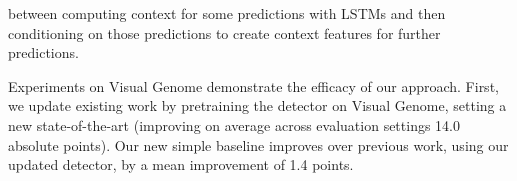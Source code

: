 \documentclass[10pt,twocolumn,letterpaper]{article}
\begin{document}
between computing context for some predictions with LSTMs and then conditioning on those predictions to create context features for further predictions.%

Experiments on Visual Genome demonstrate the efficacy of our approach. First, we update existing work by pretraining the detector on Visual Genome, setting a new state-of-the-art (improving on average across evaluation settings 14.0 absolute points).
Our new simple baseline improves over previous work, using our updated detector, by a mean improvement of 1.4 points.
\end{document}
